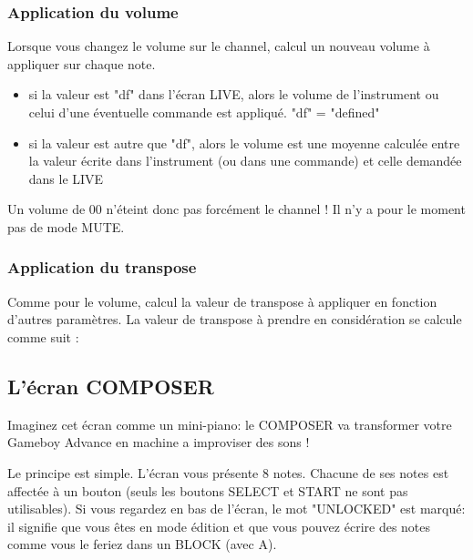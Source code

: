 \documentclass[12pt,a4paper]{article}
\begin{document}
    \subsubsection{Application du volume}

    Lorsque vous changez le volume sur le channel, \FAT calcul un nouveau volume à appliquer sur chaque note. \medskip

    \begin{itemize}
        \item{si la valeur est "df" dans l'écran LIVE, alors le volume de l'instrument ou celui d'une éventuelle commande est appliqué. "df" = "defined"}
        \item{si la valeur est autre que "df", alors le volume est une moyenne calculée entre la valeur écrite dans l'instrument (ou dans une commande) et celle demandée dans le LIVE}
    \end{itemize}
    \medskip

    Un volume de 00 n'éteint donc pas forcément le channel ! Il n'y a pour le moment pas de mode MUTE.

    \subsubsection{Application du transpose}

    Comme pour le volume, \FAT calcul la valeur de transpose à appliquer en fonction d'autres paramètres. La valeur de transpose à prendre en considération se calcule comme suit :


    \subsection{L'écran COMPOSER}
    
    Imaginez cet écran comme un mini-piano: le COMPOSER va transformer votre Gameboy Advance en machine a improviser des sons !
    
    
    Le principe est simple. L'écran vous présente 8 notes. Chacune de ses notes est affectée à un bouton (seuls les boutons SELECT et START ne sont pas utilisables). Si vous regardez en bas de l'écran, le mot "UNLOCKED" est marqué: il signifie que vous êtes en mode édition et que vous pouvez écrire des notes comme vous le feriez dans un BLOCK (avec A). \medskip
    
\end{document}
